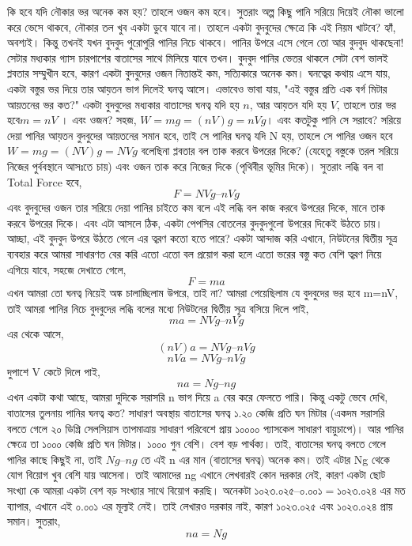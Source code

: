\documentclass[11pt,a4paper]{article}
\begin{document}
কি হবে যদি নৌকার ভর অনেক কম হয়? তাহলে ওজন কম হবে। সুতরাং অল্প কিছু পানি সরিয়ে দিয়েই নৌকা ভালো করে ভেসে থাকবে, নৌকার তল খুব একটা ডুবে যাবে না। 
তাহলে একটা বুদবুদের ক্ষেত্রে কি এই নিয়ম খাটবে? হ্যাঁ, অবশ্যই। কিন্তু তখনই যখন বুদবুদ পুরোপুরি পানির নিচে থাকবে। পানির উপরে এসে গেলে তো আর বুদবুদ থাকছেনা! সেটার মধ্যকার গ্যাস চারপাশের বাতাসের সাথে মিলিয়ে যাবে তখন। 
বুদবুদ পানির ভেতর থাকলে সেটা বেশ ভালই প্লবতার সম্মুখীন হবে, কারণ একটা বুদবুদের ওজন নিতান্তই কম, সত্যিকারে অনেক কম। 
ঘনত্বের কথায় এসে যায়, একটা বস্তুর ভর দিয়ে তার আয়তন ভাগ দিলেই ঘনত্ব আসে। এভাবেও ভাবা যায়, "এই বস্তুর প্রতি এক বর্গ মিটার আয়তনের ভর কত?" 
একটা বুদবুদের মধ্যকার বাতাসের ঘনত্ব যদি হয় $n$, আর আয়তন যদি হয় $V$, তাহলে তার ভর হবে$ m = nV$ । এবং ওজন? সহজ, $W = mg = (nV)g = nVg$।
এবং কতটুকু পানি সে সরাবে? সরিয়ে দেয়া পানির আয়তন বুদবুদের আয়তনের সমান হবে, তাই সে পানির ঘনত্ব যদি N হয়, তাহলে সে পানির ওজন হবে 
$W = mg = (NV)g = NVg$ 
বলেছিনা প্লবতার বল তাক করবে উপরের দিকে? (যেহেতু বস্তুকে তরল সরিয়ে নিজের পুর্ববস্থানে আসঃতে চায়) এবং ওজন তাক করে নিজের দিকে (পৃথিবীর ভূমির দিকে)। সুতরাং লব্ধি বল বা Total Force হবে, 
\[F = NVg – nVg\] 
এবং বুদবুদের ওজন তার সরিয়ে দেয়া পানির চাইতে কম বলে এই লব্ধি বল কাজ করবে উপরের দিকে, মানে তাক করবে উপরের দিকে। এবং এটা আসলে ঠিক, একটা পেপসির বোতলের বুদবুদগুলো উপরের দিকেই উঠতে চায়। 
আচ্ছা, এই বুদবুদ উপরে উঠতে গেলে এর ত্বরণ কতো হতে পারে? একটা আন্দাজ করি এখানে, 
নিউটনের দ্বিতীয় সূত্র ব্যবহার করে আমরা সাধারণত বের করি এতো এতো বল প্রয়োগ করা হলে এতো ভরের বস্তু কত বেশি ত্বরণ নিয়ে এগিয়ে যাবে, সহজে দেখাতে গেলে, 
\[F = ma\] 
এখন আমরা তো ঘনত্ব নিয়েই অঙ্ক চালাচ্ছিলাম উপরে, তাই না? আমরা পেয়েছিলাম যে বুদবুদের ভর হবে m=nV, তাই আমরা পানির নিচে বুদবুদের লব্ধি বলের মধ্যে নিউটনের দ্বিতীয় সূত্র বসিয়ে দিলে পাই, 
\[ma= NVg – nVg\]
এর থেকে আসে, 
\[(nV)a = NVg – nVg \]
\[nVa = NVg – nVg \] 
দুপাশে V কেটে দিলে পাই, 
\[na = Ng – ng\]
এখন একটা কথা আছে, আমরা দুদিকে সরাসরি n ভাগ দিয়ে a বের করে ফেলতে পারি। কিন্তু একটু ভেবে দেখি, বাতাসের তুলনায় পানির ঘনত্ব কত? 
সাধারণ অবস্থায় বাতাসের ঘনত্ব ১.২০ কেজি প্রতি ঘন মিটার (একদম সরাসরি বলতে গেলে ২০ ডিগ্রি সেলসিয়াস তাপমাত্রায় সাধারণ পরিবেশে প্রায় ১০০০০ প্যাসকেল সাধারণ বায়ুচাপে)। আর পানির ক্ষেত্রে তা ১০০০ কেজি প্রতি ঘন মিটার। ১০০০ গুন বেশি। বেশ বড় পার্থক্য। তাই, বাতাসের ঘনত্ব বলতে গেলে পানির কাছে কিছুই না, তাই $Ng – ng$ তে এই n এর মান (বাতাসের ঘনত্ব) অনেক কম। তাই এটার Ng থেকে যোগ বিয়োগ খুব বেশি যায় আসেনা। তাই আমাদের ng এখানে লেখবারই কোন দরকার নেই, কারণ একটা ছোট সংখ্যা কে আমরা একটা বেশ বড় সংখ্যার সাথে বিয়োগ করছি। অনেকটা $১০২৩.০২৫ – ০.০০১ = ১০২৩.০২৪$ এর মত ব্যাপার, এখানে এই ০.০০১ এর মূল্যই নেই। তাই লেখারও দরকার নাই, কারণ ১০২৩.০২৫ এবং ১০২৩.০২৪ প্রায় সমান। সুতরাং,  
\[na = Ng\] 
\end{document}
